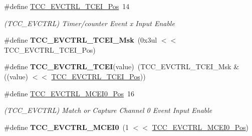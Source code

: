 \begin{DoxyCompactItemize}
\item 
\hypertarget{group___s_a_m_l21___t_c_c_ga2397bec0cdbb979500f01de4c0208791}{}\#define \hyperlink{group___s_a_m_l21___t_c_c_ga2397bec0cdbb979500f01de4c0208791}{T\+C\+C\+\_\+\+E\+V\+C\+T\+R\+L\+\_\+\+T\+C\+E\+I\+\_\+\+Pos}~14\label{group___s_a_m_l21___t_c_c_ga2397bec0cdbb979500f01de4c0208791}

\begin{DoxyCompactList}\small\item\em (T\+C\+C\+\_\+\+E\+V\+C\+T\+R\+L) Timer/counter Event x Input Enable \end{DoxyCompactList}\item 
\hypertarget{group___s_a_m_l21___t_c_c_gabd5da57ba574aa622f40e24d25b995fd}{}\#define {\bfseries T\+C\+C\+\_\+\+E\+V\+C\+T\+R\+L\+\_\+\+T\+C\+E\+I\+\_\+\+Msk}~(0x3ul $<$$<$ T\+C\+C\+\_\+\+E\+V\+C\+T\+R\+L\+\_\+\+T\+C\+E\+I\+\_\+\+Pos)\label{group___s_a_m_l21___t_c_c_gabd5da57ba574aa622f40e24d25b995fd}

\item 
\hypertarget{group___s_a_m_l21___t_c_c_ga92f1f617f6e7ebea6d98aa6d78096e5e}{}\#define {\bfseries T\+C\+C\+\_\+\+E\+V\+C\+T\+R\+L\+\_\+\+T\+C\+E\+I}(value)~(T\+C\+C\+\_\+\+E\+V\+C\+T\+R\+L\+\_\+\+T\+C\+E\+I\+\_\+\+Msk \& ((value) $<$$<$ \hyperlink{group___s_a_m_l21___t_c_c_ga2397bec0cdbb979500f01de4c0208791}{T\+C\+C\+\_\+\+E\+V\+C\+T\+R\+L\+\_\+\+T\+C\+E\+I\+\_\+\+Pos}))\label{group___s_a_m_l21___t_c_c_ga92f1f617f6e7ebea6d98aa6d78096e5e}

\item 
\hypertarget{group___s_a_m_l21___t_c_c_ga9dc28ae04e33ff52657fe94360a485b5}{}\#define \hyperlink{group___s_a_m_l21___t_c_c_ga9dc28ae04e33ff52657fe94360a485b5}{T\+C\+C\+\_\+\+E\+V\+C\+T\+R\+L\+\_\+\+M\+C\+E\+I0\+\_\+\+Pos}~16\label{group___s_a_m_l21___t_c_c_ga9dc28ae04e33ff52657fe94360a485b5}

\begin{DoxyCompactList}\small\item\em (T\+C\+C\+\_\+\+E\+V\+C\+T\+R\+L) Match or Capture Channel 0 Event Input Enable \end{DoxyCompactList}\item 
\hypertarget{group___s_a_m_l21___t_c_c_ga31b5faaf7d2d40c7170dce33660c9a56}{}\#define {\bfseries T\+C\+C\+\_\+\+E\+V\+C\+T\+R\+L\+\_\+\+M\+C\+E\+I0}~(1 $<$$<$ \hyperlink{group___s_a_m_l21___t_c_c_ga9dc28ae04e33ff52657fe94360a485b5}{T\+C\+C\+\_\+\+E\+V\+C\+T\+R\+L\+\_\+\+M\+C\+E\+I0\+\_\+\+Pos})\label{group___s_a_m_l21___t_c_c_ga31b5faaf7d2d40c7170dce33660c9a56}


\end{DoxyCompactItemize}
